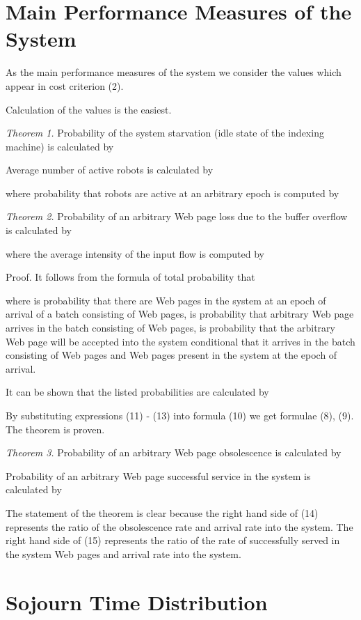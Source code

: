 \documentclass[11pt]{article}
\begin{document}
\section{Main Performance Measures of the System}

As the main performance measures of the system we consider the
values 
which appear in cost criterion (2).

Calculation of the values  is the easiest.

{\it Theorem 1.} Probability  of the system starvation
(idle state of the indexing machine) is calculated by

Average number  of active robots is calculated by

where probability  that  robots are active at an
arbitrary epoch is computed by

{\it Theorem 2.} Probability  of an arbitrary Web page
loss due to the buffer overflow is calculated by

where the average intensity  of the input flow is computed
by

Proof. It follows from the formula of total probability that

where  is probability that there are  Web pages in the
system at an epoch of arrival of a batch consisting of 
Web pages,  is probability that arbitrary Web page arrives in
the batch consisting of  Web pages,  is probability
that the arbitrary Web page will be accepted into the system
conditional that it arrives in the batch consisting of  Web pages
and  Web pages present in the system at the epoch of arrival.

It can be shown that the listed probabilities are calculated by




By substituting expressions (11) - (13) into formula (10) we get
formulae (8), (9). The theorem is proven.

{\it Theorem 3.} Probability  of an arbitrary Web page
obsolescence is calculated by

Probability  of an arbitrary Web page successful
service in the system is calculated by

The statement of the theorem is clear because the right hand side of
(14) represents the ratio of the obsolescence rate and arrival rate
into the system. The right hand side of (15) represents the ratio of
the  rate of  successfully  served in the system Web pages and
arrival rate into the system.

\section{Sojourn Time Distribution}
\end{document}
